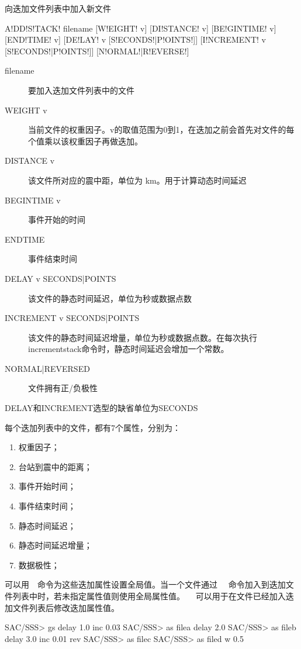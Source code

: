 \label{sss:addstack}

向迭加文件列表中加入新文件

\begin{SACSTX}
A!DD!S!TACK! filename [W!EIGHT! v] [DI!STANCE! v]
    [BE!GINTIME! v] [END!TIME! v]
    [DE!LAY! v [S!ECONDS!|P!OINTS!]]
    [I!NCREMENT! v [S!ECONDS!|P!OINTS!]]
    [N!ORMAL!|R!EVERSE!]
\end{SACSTX}

\begin{description}
\item [filename] 要加入迭加文件列表中的文件
\item [WEIGHT v] 当前文件的权重因子。v的取值范围为0到1，在迭加之前会首先对文件的每个值乘以该权重因子再做迭加。
\item [DISTANCE v] 该文件所对应的震中距，单位为 \si{\km}。用于计算动态时间延迟
\item [BEGINTIME v] 事件开始的时间
\item [ENDTIME] 事件结束时间
\item [DELAY v SECONDS|POINTS] 该文件的静态时间延迟，单位为秒或数据点数
\item [INCREMENT v SECONDS|POINTS] 该文件的静态时间延迟增量，单位为秒或数据点数。在每次执行incrementstack命令时，静态时间延迟会增加一个常数。
\item [NORMAL|REVERSED] 文件拥有正/负极性
\end{description}

DELAY和INCREMENT选型的缺省单位为SECONDS

每个迭加列表中的文件，都有7个属性，分别为：
\begin{enumerate}
\item 权重因子；
\item 台站到震中的距离；
\item 事件开始时间；
\item 事件结束时间；
\item 静态时间延迟；
\item 静态时间延迟增量；
\item 数据极性；
\end{enumerate}

可以用~~命令为这些迭加属性设置全局值。当一个文件通过
~~命令加入到迭加文件列表中时，若未指定属性值则使用全局属性值。
~~可以用于在文件已经加入迭加文件列表后修改迭加属性值。

\begin{SACCode}
SAC/SSS> gs delay 1.0 inc 0.03
SAC/SSS> as filea delay 2.0
SAC/SSS> as fileb delay 3.0 inc 0.01 rev
SAC/SSS> as filec
SAC/SSS> as filed w 0.5
\end{SACCode}

